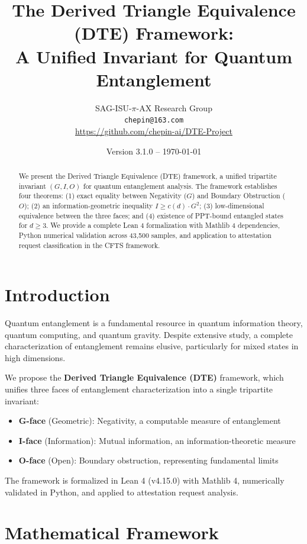 \documentclass[11pt,a4paper]{article}
\title{The Derived Triangle Equivalence (DTE) Framework: \\ A Unified Invariant for Quantum Entanglement}
\author{SAG-ISU-$\pi$-AX Research Group \\
  \texttt{chepin@163.com} \\
  \url{https://github.com/chepin-ai/DTE-Project}}
\date{Version 3.1.0 -- \today}
\theoremstyle{definition}
\begin{document}
\maketitle

\begin{abstract}
We present the Derived Triangle Equivalence (DTE) framework, a unified tripartite invariant $(G, I, O)$ for quantum entanglement analysis. The framework establishes four theorems: (1) exact equality between Negativity ($G$) and Boundary Obstruction ($O$); (2) an information-geometric inequality $I \geq c(d) \cdot G^2$; (3) low-dimensional equivalence between the three faces; and (4) existence of PPT-bound entangled states for $d \geq 3$. We provide a complete Lean 4 formalization with Mathlib 4 dependencies, Python numerical validation across 43,500 samples, and application to attestation request classification in the CFTS framework.
\end{abstract}

\section{Introduction}

Quantum entanglement is a fundamental resource in quantum information theory, quantum computing, and quantum gravity. Despite extensive study, a complete characterization of entanglement remains elusive, particularly for mixed states in high dimensions.

We propose the \textbf{Derived Triangle Equivalence (DTE)} framework, which unifies three faces of entanglement characterization into a single tripartite invariant:
\begin{itemize}
    \item \textbf{G-face} (Geometric): Negativity, a computable measure of entanglement
    \item \textbf{I-face} (Information): Mutual information, an information-theoretic measure
    \item \textbf{O-face} (Open): Boundary obstruction, representing fundamental limits
\end{itemize}

The framework is formalized in Lean 4 (v4.15.0) with Mathlib 4, numerically validated in Python, and applied to attestation request analysis.

\section{Mathematical Framework}
\end{document}
